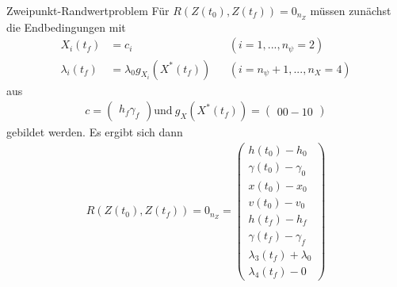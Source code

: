\documentclass[aspectratio=169]{beamer}
\begin{document}
\begin{frame}
\begin{block}{Zweipunkt-Randwertproblem } 
  \scriptsize
Für $R(Z(t_0),Z(t_f)) = 0_{n_Z}$ müssen zunächst die Endbedingungen mit
\begin{align*}
X_i(t_f) &= c_i & & (i=1,...,n_{\psi}=2) \\
\lambda_i(t_f) &= \lambda_0 g_{X_i}(X^{\ast}(t_f)) & &(i=n_{\psi}+1,...,n_X=4)
\end{align*}
aus
\begin{align*}
c = \begin{pmatrix} h_f  \gamma_f \end{pmatrix} \text{und} \  g_{X}(X^{\ast}(t_f)) = \begin{pmatrix} 0  0 -1 0 \end{pmatrix}
\end{align*}
gebildet werden. Es ergibt sich dann
\begin{align*}
R(Z(t_0),Z(t_f)) = 0_{n_Z} = \begin{pmatrix}
h(t_0) - h_0 \\ 
\gamma(t_0) - \gamma_0 \\
x(t_0) - x_0 \\ 
v(t_0) - v_0 \\ 
h(t_f) - h_f \\ 
\gamma(t_f) - \gamma_f \\
\lambda_3(t_f) + \lambda_0 \\ 
\lambda_4(t_f) - 0
\end{pmatrix}
\end{align*}
   \end{block}
\end{frame}
\end{document}
